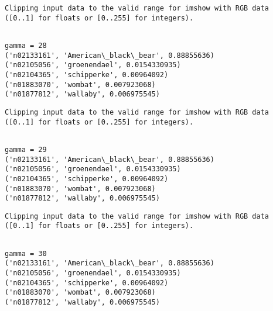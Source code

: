 \documentclass[11pt]{article}
\begin{document}
    \begin{Verbatim}[commandchars=\\\{\}]
Clipping input data to the valid range for imshow with RGB data ([0..1] for floats or [0..255] for integers).

    \end{Verbatim}

    \begin{Verbatim}[commandchars=\\\{\}]

gamma = 28
('n02133161', 'American\_black\_bear', 0.88855636)
('n02105056', 'groenendael', 0.0154330935)
('n02104365', 'schipperke', 0.00964092)
('n01883070', 'wombat', 0.007923068)
('n01877812', 'wallaby', 0.006975545)

    \end{Verbatim}

    \begin{Verbatim}[commandchars=\\\{\}]
Clipping input data to the valid range for imshow with RGB data ([0..1] for floats or [0..255] for integers).

    \end{Verbatim}

    \begin{Verbatim}[commandchars=\\\{\}]

gamma = 29
('n02133161', 'American\_black\_bear', 0.88855636)
('n02105056', 'groenendael', 0.0154330935)
('n02104365', 'schipperke', 0.00964092)
('n01883070', 'wombat', 0.007923068)
('n01877812', 'wallaby', 0.006975545)

    \end{Verbatim}

    \begin{Verbatim}[commandchars=\\\{\}]
Clipping input data to the valid range for imshow with RGB data ([0..1] for floats or [0..255] for integers).

    \end{Verbatim}

    \begin{Verbatim}[commandchars=\\\{\}]

gamma = 30
('n02133161', 'American\_black\_bear', 0.88855636)
('n02105056', 'groenendael', 0.0154330935)
('n02104365', 'schipperke', 0.00964092)
('n01883070', 'wombat', 0.007923068)
('n01877812', 'wallaby', 0.006975545)

    \end{Verbatim}
\end{document}
